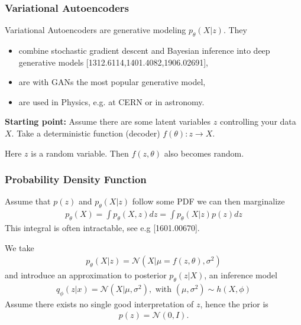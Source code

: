 \documentclass{beamer}
\newcommand{\cN}{\mathcal{N}}
\newcommand{\bi}{\begin{itemize}}
\newcommand{\ei}{\end{itemize}}
\begin{document}

\begin{frame}
\frametitle{Variational Autoencoders}
Variational Autoencoders are generative modeling $p_\theta(X|z)$. They
\bi
\item combine stochastic gradient descent and Bayesian inference into deep generative models {\color{blue} [1312.6114,1401.4082,1906.02691]},
\item are with GANs the most popular generative model,
\item are used in Physics, e.g. at CERN or in astronomy.
\ei
\pause
\vspace{0.2cm} 
\textbf{Starting point:} Assume there are some latent variables $z$ controlling your data $X$. Take a deterministic function (decoder) $f(\theta): z \rightarrow X$. 

Here $z$ is a random variable. Then $f(z, \theta)$ also becomes random.
\end{frame}


\begin{frame}
\frametitle{Probability Density Function}
Assume that $p(z)$ and $p_\theta(X|z)$ follow some PDF we can then marginalize
\begin{align}
	p_\theta(X) = \int p_\theta(X,z) dz = \int p_\theta(X|z) p(z) dz
\end{align}
This integral is often intractable, see e.g {\color{blue}[1601.00670]}.

\pause
We take
\begin{align}
	p_\theta(X|z) = \cN(X|\mu = f(z,\theta), \sigma^2)
\end{align}
and introduce an approximation to posterior $p_\theta(z|X)$, an inference model 
\begin{align}
q_\phi(z|x) = \cN(X|\mu, \sigma^2), \text{ with } (\mu, \sigma^2) \sim h(X, \phi)
\end{align}
Assume there exists no single good interpretation of $z$, hence the prior is
\begin{align}
	p(z) =  \cN(0,I).
\end{align}
\end{frame}
\end{document}
